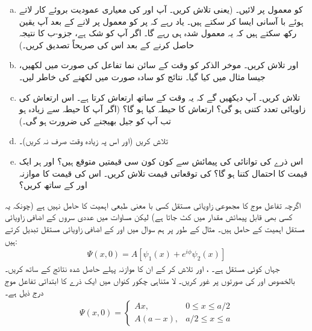 \begin{enumerate}[a.]
\item 
{} کو معمول پر لائیں۔ (یعنی  تلاش کریں۔ آپ  اور  کی معیاری عمودیت بروئے کار لاتے ہوئے با آسانی ایسا کر سکتے ہیں۔ یاد رہے کہ  پر  کو معمول پر لانے کے بعد آپ یقین رکھ سکتے  ہیں کہ یہ معمول شدہ ہی رہے گا۔ اگر آپ کو شک ہے، جزو-ب کا نتیجہ حاصل کرنے کے بعد  اس کی صریحاً تصدیق کریں۔) 
\item
{} اور  تلاش کریں۔ موخر الذکر  کو وقت کے سائن نما تفاعل کی صورت میں لکھیں، جیسا مثال  میں کیا گیا۔ نتائج کو سادہ صورت میں لکھنے کی خاطر  لیں۔ 
\item 
{} تلاش کریں۔ آپ دیکھیں گے کہ یہ وقت کے ساتھ ارتعاش کرتا ہے۔ اس ارتعاش کی زاویائی تعدد کتنی ہو گی؟ ارتعاش کا حیطہ کیا ہو گا؟ (اگر آپ کا حیطہ  سے زیادہ ہو تب آپ کو جیل بھیجنے کی ضرورت ہو گی۔) 
\item 
{} تلاش کریں (اور اس پہ زیادہ وقت صرف نہ کریں)۔ 
\item
اس ذرے کی توانائی کی پیمائش سے کون کون سی قیمتیں متوقع ہیں؟ اور ہر ایک قیمت کا احتمال کتنا ہو گا؟  کی توقعاتی قیمت تلاش کریں۔ اس کی قیمت کا موازنہ  اور  کے ساتھ کریں؟
\end{enumerate}
اگرچہ تفاعل موج کا مجموعی زاویائی مستقل کسی با معنی طبعی اہمیت کا حامل نہیں ہے (چونکہ یہ کسی بھی قابل پیمائش مقدار میں کٹ جاتا ہے) لیکن  مساوات  میں عددی سروں کے اضافی زاویائی مستقل اہمیت کے حامل ہیں۔ مثال کے طور پر ہم سوال  میں   اور  کے اضافی زاویائی مستقل تبدیل کرتے ہیں:
\begin{align*}
\Psi (x,0) = A[\psi_{1} (x) + e^{i\phi}\psi_{2}(x)]
\end{align*}
جہاں  کوئی مستقل ہے۔ ،  اور  تلاش کر کے ان کا موازنہ پہلے حاصل شدہ نتائج کے ساتھ کریں۔ بالخصوص  اور   کی صورتوں پر غور کریں۔ 
لا متناہی چکور کنواں میں ایک ذرے کا ابتدائی تفاعل موج درج ذیل ہے۔
\begin{align*}
\Psi (x,0) = 
\begin{cases}
Ax, & 0 \leq x \leq a/2 \\ 
A(a-x), & a/2 \leq x \leq a
\end{cases}
\end{align*}
